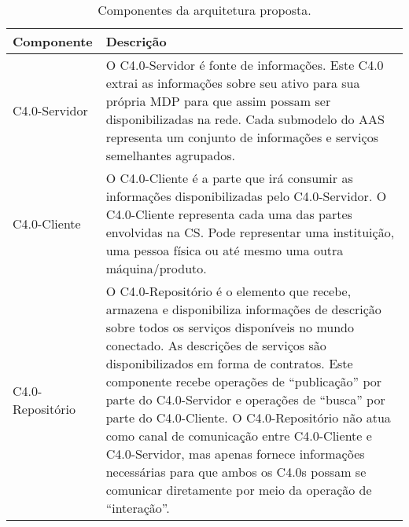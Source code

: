 \begin{table}[htb]
	\centering
	\caption{Componentes da arquitetura proposta.}
	\label{tab:componentes-ws}
	\begin{tabular}{p{3cm}p{12cm}}
		\hline
		\textbf{Componente}
		 & \textbf{Descrição}                                                                                                                                                                                                                                                                                                                                                                                                                                                                                                                                                                                \\

		\hline
		C4.0-Servidor
		 & O C4.0-Servidor é fonte de informações. Este C4.0 extrai as informações sobre seu ativo para sua própria MDP para que assim possam ser disponibilizadas na rede. Cada submodelo do AAS representa um conjunto de informações e serviços semelhantes agrupados.                                                                                                                                                                                                                                                                                                                                    \\

		\hline
		C4.0-Cliente
		 & O C4.0-Cliente é a parte que irá consumir as informações disponibilizadas pelo C4.0-Servidor. O C4.0-Cliente representa cada uma das partes envolvidas na CS. Pode representar uma instituição, uma pessoa física ou até mesmo uma outra máquina/produto.                                                                                                                                                                                                                                                                                                                                         \\

		\hline
		C4.0-Repositório
		 & O C4.0-Repositório é o elemento que recebe, armazena e disponibiliza informações de descrição sobre todos os serviços disponíveis no mundo conectado. As descrições de serviços são disponibilizados em forma de contratos. Este componente recebe operações de ``publicação'' por parte do C4.0-Servidor e operações de ``busca'' por parte do C4.0-Cliente. O C4.0-Repositório não atua como canal de comunicação entre C4.0-Cliente e C4.0-Servidor, mas apenas fornece informações necessárias para que ambos os C4.0s possam se comunicar diretamente por meio da operação de ``interação''. \\

		\hline
	\end{tabular}
\end{table}


